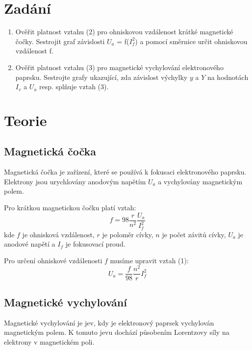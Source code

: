 \documentclass[a4paper,11pt]{article}
\begin{document}
\vskip10pt
    \begin{minipage}[t]{0.5\textwidth} 
        \section{Zadání}    
            \begin{enumerate}
                \item Ověřit platnost vztahu (2) pro ohniskovou vzdálenost krátké magnetické čočky. Sestrojit graf závislosti $U_a$ = f($I^2_f$) a pomocí směrnice určit ohniskovou vzdálenost f.
                \item Ověřit platnost vztahu (3) pro magnetické vychylování elektronového paprsku. Sestrojte grafy ukazující, zda závislost výchylky $y$ a $Y$ na hodnotách $I_v$ a $U_a$ resp. splňuje vztah (3).
            \end{enumerate}
        \section{Teorie}
            \subsection{Magnetická čočka}
                Magnetická čočka je zařízení, které se používá k fokusaci elektronového paprsku. Elektrony jsou urychlovány anodovým napětím $U_a$ a vychylovány magnetickým polem. 
                \par Pro krátkou magnetickou čočku platí vztah:
                \begin{equation}
                    f = 98\frac{r}{n^2}\frac{U_a}{I_f^2}
                \end{equation}
                kde $f$ je ohnisková vzdálenost, $r$ je poloměr cívky, $n$ je počet závitů cívky, $U_a$ je anodové napětí a $I_f$ je fokusovací proud.
                \par Pro určení ohniskové vzdálenosti $f$ musíme upravit vztah (1):
                \begin{equation}
                    U_a = \frac{f}{98}\frac{n^2}{r}I_f^2
                \end{equation}
            \subsection{Magnetické vychylování}
                Magnetické vychylování je jev, kdy je elektronový paprsek vychylován magnetickým polem. K tomuto jevu dochází působením Lorentzovy síly na elektrony v magnetickém poli. 
    \end{minipage}
\end{document}
